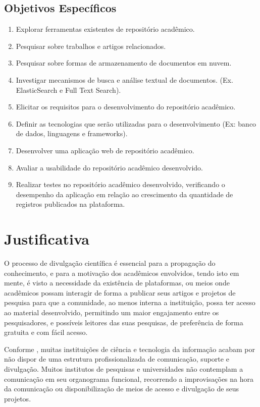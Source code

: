 \subsection{Objetivos Específicos}
\begin{enumerate}
    \item Explorar ferramentas existentes de repositório acadêmico.
    \item Pesquisar sobre trabalhos e artigos relacionados.
    \item Pesquisar sobre formas de armazenamento de documentos em nuvem.
    \item Investigar mecanismos de busca e análise textual de documentos. (Ex. ElasticSearch e Full Text Search).
    \item Elicitar os requisitos para o desenvolvimento do repositório acadêmico.
    \item Definir as tecnologias que serão utilizadas para o desenvolvimento (Ex: banco de dados, linguagens e frameworks).
    \item Desenvolver uma aplicação web de repositório acadêmico.
    \item Avaliar a usabilidade do repositório acadêmico desenvolvido.
    \item Realizar testes no repositório acadêmico desenvolvido, verificando o desempenho da aplicação em relação ao crescimento da quantidade de registros publicados na plataforma.

\end{enumerate}


\section{Justificativa}\label{sec:justification}

O processo de divulgação científica é essencial para a propagação do
conhecimento, e para a motivação dos acadêmicos envolvidos,
tendo isto em mente, é visto a necessidade da existência de plataformas,
ou meios onde acadêmicos possam interagir de forma a publicar
seus artigos e projetos de pesquisa para que a comunidade, ao menos interna a instituição,
possa ter acesso ao material desenvolvido, permitindo um maior engajamento
entre os pesquisadores, e possíveis leitores das suas pesquisas,
de preferência de forma gratuita e com fácil acesso.

Conforme \citep[p. 15]{PORTO:difusao_cientifica_recortes}, muitas
instituições de ciência e tecnologia da informação acabam por não dispor
de uma estrutura profissionalizada de comunicação, suporte e divulgação.
Muitos institutos de pesquisas e universidades não contemplam a comunicação
em seu organograma funcional, recorrendo a improvisações na hora da
comunicação ou disponibilização de meios de acesso e divulgação
de seus projetos.

